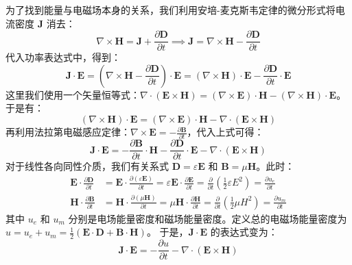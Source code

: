 \documentclass[fontset=none]{ctexart}
\begin{document}
为了找到能量与电磁场本身的关系，我们利用安培-麦克斯韦定律的微分形式将电流密度 $\bm{J}$ 消去：
\begin{equation}
    \nabla \times \bm{H} = \bm{J} + \frac{\partial \bm{D}}{\partial t} \implies \bm{J} = \nabla \times \bm{H} - \frac{\partial \bm{D}}{\partial t}
\end{equation}
代入功率表达式中，得到：
\begin{equation}
    \bm{J} \cdot \bm{E} = \left(\nabla \times \bm{H} - \frac{\partial \bm{D}}{\partial t}\right) \cdot \bm{E} = (\nabla \times \bm{H}) \cdot \bm{E} - \frac{\partial \bm{D}}{\partial t} \cdot \bm{E}
\end{equation}
这里我们使用一个矢量恒等式：$\nabla \cdot (\bm{E} \times \bm{H}) = (\nabla \times \bm{E}) \cdot \bm{H} - (\nabla \times \bm{H}) \cdot \bm{E}$。于是有：
\begin{equation}
    (\nabla \times \bm{H}) \cdot \bm{E} = (\nabla \times \bm{E}) \cdot \bm{H} - \nabla \cdot (\bm{E} \times \bm{H})
\end{equation}
再利用法拉第电磁感应定律：$\nabla \times \bm{E} = -\frac{\partial \bm{B}}{\partial t}$，代入上式可得：
\begin{equation}
    \bm{J} \cdot \bm{E} = -\frac{\partial \bm{B}}{\partial t} \cdot \bm{H} - \frac{\partial \bm{D}}{\partial t} \cdot \bm{E} - \nabla \cdot (\bm{E} \times \bm{H})
\end{equation}
对于线性各向同性介质，我们有关系式 $\bm{D} = \varepsilon \bm{E}$ 和 $\bm{B} = \mu \bm{H}$。此时：
\begin{equation}
\begin{aligned}
    \bm{E} \cdot \frac{\partial \bm{D}}{\partial t} &= \bm{E} \cdot \frac{\partial (\varepsilon \bm{E})}{\partial t} = \varepsilon \bm{E} \cdot \frac{\partial \bm{E}}{\partial t} = \frac{\partial}{\partial t}\left(\frac{1}{2}\varepsilon E^2\right) = \frac{\partial u_e}{\partial t} \\
    \bm{H} \cdot \frac{\partial \bm{B}}{\partial t} &= \bm{H} \cdot \frac{\partial (\mu \bm{H})}{\partial t} = \mu \bm{H} \cdot \frac{\partial \bm{H}}{\partial t} = \frac{\partial}{\partial t}\left(\frac{1}{2}\mu H^2\right) = \frac{\partial u_m}{\partial t}
\end{aligned}
\end{equation}
其中 $u_e$ 和 $u_m$ 分别是电场能量密度和磁场能量密度。定义总的电磁场能量密度为 $u = u_e + u_m = \frac{1}{2}(\bm{E}\cdot\bm{D} + \bm{B}\cdot\bm{H})$。
于是，$\bm{J} \cdot \bm{E}$ 的表达式变为：
\begin{equation}
    \bm{J} \cdot \bm{E} = - \frac{\partial u}{\partial t} - \nabla \cdot (\bm{E} \times \bm{H})
\end{equation}
\end{document}
